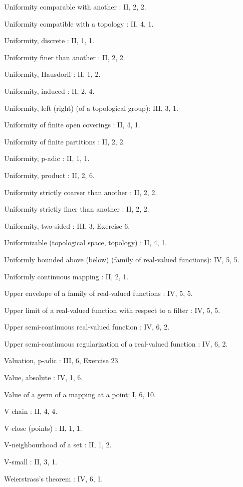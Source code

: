 Uniformity comparable with another : II, 2, 2.

Uniformity compatible with a topology : II, 4, 1.

Uniformity, discrete : II, 1, 1.

Uniformity finer than another : II, 2, 2.

Uniformity, Hausdorff : II, 1, 2.

Uniformity, induced : II, 2, 4.

Uniformity, left (right) (of a topological group): III, 3, 1.

Uniformity of finite open coverings : II, 4, 1.

Uniformity of finite partitions : II, 2, 2.

Uniformity, p-adic : II, 1, 1.

Uniformity, product : II, 2, 6.

Uniformity strictly coarser than another : II, 2, 2.

Uniformity strictly finer than another : II, 2, 2.

Uniformity, two-sided : III, 3, Exercise 6.

Uniformizable (topological space, topology) : II, 4, 1.

Uniformly bounded above (below) (family of real-valued functions): IV, 5, 5.

Uniformly continuous mapping : II, 2, 1.

Upper envelope of a family of real-valued functions : IV, 5, 5.

Upper limit of a real-valued function with respect to a filter : IV, 5, 5.

Upper semi-continuous real-valued function : IV, 6, 2.

Upper semi-continuous regularization of a real-valued function : IV, 6, 2.

Valuation, p-adic : III, 6, Exercise 23.

Value, absolute : IV, 1, 6.

Value of a germ of a mapping at a point: I, 6, 10.

V-chain : II, 4, 4.

V-close (points) : II, 1, 1.

V-neighbourhood of a set : II, 1, 2.

V-small : II, 3, 1.

Weierstrass's theorem : IV, 6, 1.
